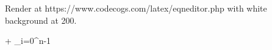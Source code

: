 Render at https://www.codecogs.com/latex/eqneditor.php with white background at 200.

 + \sum_{i=0}^{n-1} 
